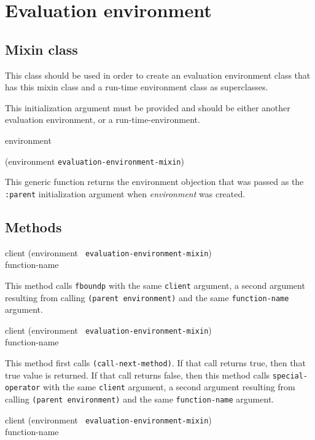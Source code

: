 \chapter{Evaluation environment}

\section{Mixin class}


This class should be used in order to create an evaluation environment
class that has this mixin class and a run-time environment class as
superclasses.


This initialization argument must be provided and should be either
another evaluation environment, or a run-time-environment.

 {environment}

 {(environment {\tt evaluation-environment-mixin})}

This generic function returns the environment objection that was passed
as the \texttt{:parent} initialization argument when
\textit{environment} was created.

\section{Methods}

{\small{} {client (environment {\tt
      evaluation-environment-mixin}) \\ function-name}
}

This method calls \texttt{fboundp} with the same \texttt{client} argument, a
second argument resulting from calling \texttt{(parent environment)} and the
same \texttt{function-name} argument.

{\small{} {client (environment {\tt
      evaluation-environment-mixin}) \\ function-name}
}

This method first calls \texttt{(call-next-method)}.  If that call
returns true, then that true value is returned.  If that call returns
false, then this method calls \texttt{special-operator} with the same
\texttt{client} argument, a second argument resulting from calling
\texttt{(parent environment)} and the same \texttt{function-name}
argument.

{\small{} {client (environment {\tt
      evaluation-environment-mixin}) \\ function-name}
}


